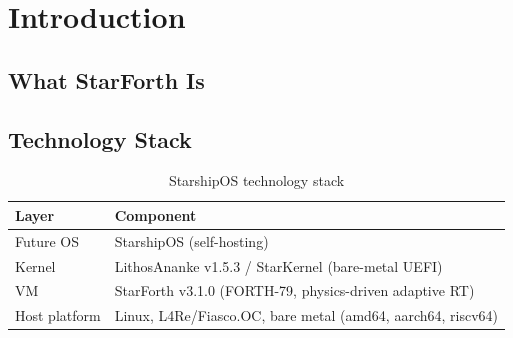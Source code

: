 
\chapter{Introduction}
\label{vol1:chap:intro}


\section{What StarForth Is}
\label{vol1:sec:intro:what}


\section{Technology Stack}
\label{vol1:sec:intro:stack}


\begin{table}[ht]
  \centering
  \caption{StarshipOS technology stack}
  \label{tab:stack}
  \begin{tabular}{ll}
    \toprule
    Layer & Component \\
    \midrule
    Future OS       & StarshipOS (self-hosting) \\
    Kernel          & LithosAnanke v1.5.3 / StarKernel (bare-metal UEFI) \\
    VM              & StarForth v3.1.0 (FORTH-79, physics-driven adaptive RT) \\
    Host platform   & Linux, L4Re/Fiasco.OC, bare metal (amd64, aarch64, riscv64) \\
    \bottomrule
  \end{tabular}
\end{table}


